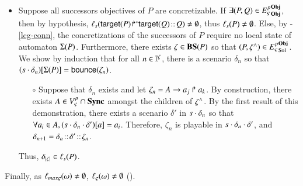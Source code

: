 \begin{proofapproxinf}
\begin{itemize}
  \item Suppose all successors objectives of $P$ are concretizable.
    If $\exists (P, Q) \in {E_\varsigma^p}^{\mathbf{Obj}}_{\mathbf{Obj}}$, then by hypothesis,
      $\ell_{s}({\mathsf{target}(P)\!\Rsh^*\!\!\mathsf{target}(Q)} \!::\! Q) \neq \emptyset$, thus
      $\ell_{s}(P) \neq \emptyset$.
    Else, by -\ref{lcg-conn}, the concretizations of the successors of $P$ require no local state of automaton $\Sigma(P)$.
      Furthermore, there exists $\zeta \in \mathbf{BS}(P)$ so that $(P, \zeta^\wedge) \in {E_\varsigma^p}^{\mathbf{Obj}}_{\mathrm{Sol}}$.
      We show by induction that for all $n \in \mathbb{I}^{\zeta}$, there is a scenario $\delta_n$ so that ${(s \cdot \delta_n)[\Sigma(P)]} = \mathsf{bounce}(\zeta_n)$.
      \begin{itemize}
        \item[$\circ$] Suppose that $\delta_n$ exists and let $\zeta_n = A\rightarrow a_j\Rsh a_k$.
        By construction, there exists $A \in {V_\varsigma^p} \cap \mathbf{Sync}$
        amongst the children of $\zeta^\wedge$.
        By the first result of this demonstration,
        there exists a scenario $\delta'$ in $s \cdot \delta_n$ so that
        $\forall a_i \in A, {(s \cdot \delta_n \cdot \delta')[a]} = a_i$.
        Therefore, $\zeta_n$ is playable in $s \cdot \delta_n \cdot \delta'$,
        and $\delta_{n+1} = \delta_n \!::\! \delta' \!::\! \zeta_n$.
      \end{itemize}
      Thus, $\delta_{|\zeta|} \in \ell_s(P)$. %
\end{itemize}
Finally, as $\ell_{max\varsigma}(\omega) \neq \emptyset$, $\ell_\varsigma(\omega) \neq
\emptyset$ ().
\end{proofapproxinf}
